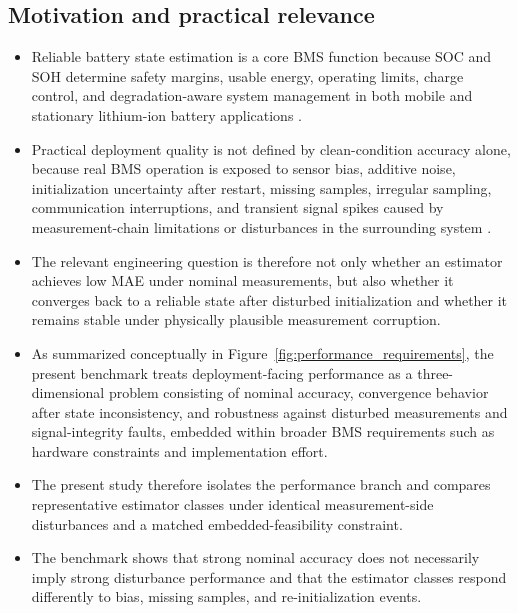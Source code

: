 \documentclass[review]{elsarticle}
\begin{document}
\subsection{Motivation and practical relevance}
\begin{itemize}[leftmargin=*]
    \item Reliable battery state estimation is a core BMS function because SOC and SOH determine safety margins, usable energy, operating limits, charge control, and degradation-aware system management in both mobile and stationary lithium-ion battery applications \cite{shrivastavaReviewTechnologicalAdvancement2023,guoSystematicReviewElectrochemical2024,yaoSmarterBatteryManagement2025b}.
    \item Practical deployment quality is not defined by clean-condition accuracy alone, because real BMS operation is exposed to sensor bias, additive noise, initialization uncertainty after restart, missing samples, irregular sampling, communication interruptions, and transient signal spikes caused by measurement-chain limitations or disturbances in the surrounding system \cite{liRobustnessSOCEstimation2015,naseriReliableWirelessBMS2025,bergerBenchmarkingBatteryManagement2024}.
    \item The relevant engineering question is therefore not only whether an estimator achieves low MAE under nominal measurements, but also whether it converges back to a reliable state after disturbed initialization and whether it remains stable under physically plausible measurement corruption.
    \item As summarized conceptually in Figure~\ref{fig:performance_requirements}, the present benchmark treats deployment-facing performance as a three-dimensional problem consisting of nominal accuracy, convergence behavior after state inconsistency, and robustness against disturbed measurements and signal-integrity faults, embedded within broader BMS requirements such as hardware constraints and implementation effort.
    \item The present study therefore isolates the performance branch and compares representative estimator classes under identical measurement-side disturbances and a matched embedded-feasibility constraint.
    \item The benchmark shows that strong nominal accuracy does not necessarily imply strong disturbance performance and that the estimator classes respond differently to bias, missing samples, and re-initialization events.
\end{itemize}
\end{document}
